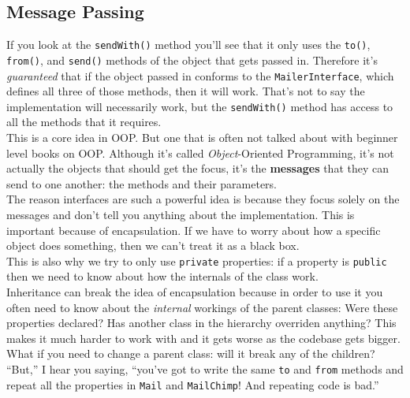 

\subsection{Message Passing}

If you look at the \texttt{sendWith()} method you'll see that it only uses the \texttt{to()}, \texttt{from()}, and \texttt{send()} methods of the object that gets passed in. Therefore it's \textit{guaranteed} that if the object passed in conforms to the \texttt{MailerInterface}, which defines all three of those methods, then it will work. That's not to say the implementation will necessarily work, but the \texttt{sendWith()} method has access to all the methods that it requires.
\\

This is a core idea in OOP. But one that is often not talked about with beginner level books on OOP. Although it's called \textit{Object}-Oriented Programming, it's not actually the objects that should get the focus, it's the \textbf{messages} that they can send to one another: the methods and their parameters.
\\

The reason interfaces are such a powerful idea is because they focus solely on the messages and don't tell you anything about the implementation. This is important because of encapsulation. If we have to worry about how a specific object does something, then we can't treat it as a black box.
\\

This is also why we try to only use \texttt{private} properties: if a property is \texttt{public} then we need to know about how the internals of the class work.
\\

Inheritance can break the idea of encapsulation because in order to use it you often need to know about the \textit{internal} workings of the parent classes: Were these properties declared? Has another class in the hierarchy overriden anything? This makes it much harder to work with and it gets worse as the codebase gets bigger. What if you need to change a parent class: will it break any of the children?
\\

``But,'' I hear you saying, ``you've got to write the same \texttt{to} and \texttt{from} methods and repeat all the properties in \texttt{Mail} and \texttt{MailChimp}! And repeating code is bad.''
\\

